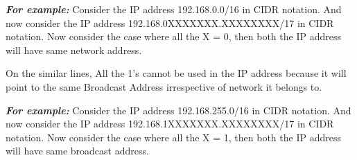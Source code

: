 \documentclass[12pt]{article}
\begin{document}
\textbf{\textit{For example:}} Consider the IP address 192.168.0.0/16 in CIDR notation. And now consider the IP address 192.168.0XXXXXXX.XXXXXXXX/17 in CIDR notation. Now consider the case where all the X = 0, then both the IP address will have same network address.

On the similar lines, All the 1's cannot be used in the IP address because it will point to the same Broadcast Address irrespective of network it belongs to.

\textit{\textbf{For example:}} Consider the IP address 192.168.255.0/16 in CIDR notation. And now consider the IP address 192.168.1XXXXXXX.XXXXXXXX/17 in CIDR notation. Now consider the case where all the X = 1, then both the IP address will have same broadcast address.
\end{document}
